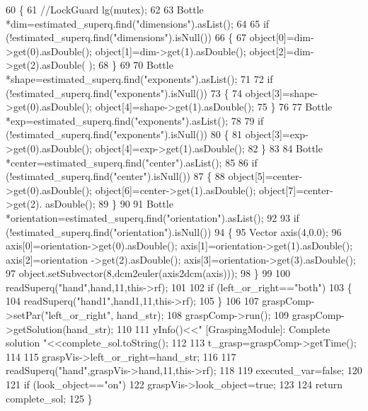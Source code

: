 \begin{DoxyCode}
60 \{
61     \textcolor{comment}{//LockGuard lg(mutex);}
62 
63     Bottle *dim=estimated\_superq.find(\textcolor{stringliteral}{"dimensions"}).asList();
64 
65     \textcolor{keywordflow}{if} (!estimated\_superq.find(\textcolor{stringliteral}{"dimensions"}).isNull())
66     \{
67         \textcolor{keywordtype}{object}[0]=dim->get(0).asDouble(); \textcolor{keywordtype}{object}[1]=dim->get(1).asDouble(); \textcolor{keywordtype}{object}[2]=dim->get(2).asDouble(
      );
68     \}
69 
70     Bottle *shape=estimated\_superq.find(\textcolor{stringliteral}{"exponents"}).asList();
71 
72     \textcolor{keywordflow}{if} (!estimated\_superq.find(\textcolor{stringliteral}{"exponents"}).isNull())
73     \{
74         \textcolor{keywordtype}{object}[3]=shape->get(0).asDouble(); \textcolor{keywordtype}{object}[4]=shape->get(1).asDouble();
75     \}
76 
77     Bottle *exp=estimated\_superq.find(\textcolor{stringliteral}{"exponents"}).asList();
78 
79     \textcolor{keywordflow}{if} (!estimated\_superq.find(\textcolor{stringliteral}{"exponents"}).isNull())
80     \{
81         \textcolor{keywordtype}{object}[3]=exp->get(0).asDouble(); \textcolor{keywordtype}{object}[4]=exp->get(1).asDouble();
82     \}
83 
84     Bottle *center=estimated\_superq.find(\textcolor{stringliteral}{"center"}).asList();
85 
86     \textcolor{keywordflow}{if} (!estimated\_superq.find(\textcolor{stringliteral}{"center"}).isNull())
87     \{
88         \textcolor{keywordtype}{object}[5]=center->get(0).asDouble(); \textcolor{keywordtype}{object}[6]=center->get(1).asDouble(); \textcolor{keywordtype}{object}[7]=center->get(2).
      asDouble();
89     \}
90 
91     Bottle *orientation=estimated\_superq.find(\textcolor{stringliteral}{"orientation"}).asList();
92 
93     \textcolor{keywordflow}{if} (!estimated\_superq.find(\textcolor{stringliteral}{"orientation"}).isNull())
94     \{
95         Vector axis(4,0.0);
96         axis[0]=orientation->get(0).asDouble(); axis[1]=orientation->get(1).asDouble(); axis[2]=orientation
      ->get(2).asDouble(); axis[3]=orientation->get(3).asDouble();
97         \textcolor{keywordtype}{object}.setSubvector(8,dcm2euler(axis2dcm(axis)));
98     \}
99 
100     readSuperq(\textcolor{stringliteral}{"hand"},hand,11,this->rf);
101 
102     \textcolor{keywordflow}{if} (left\_or\_right==\textcolor{stringliteral}{"both"})
103     \{
104         readSuperq(\textcolor{stringliteral}{"hand1"},hand1,11,this->rf);
105     \}
106 
107     graspComp->setPar(\textcolor{stringliteral}{"left\_or\_right"}, hand\_str);
108     graspComp->run();
109     graspComp->getSolution(hand\_str);
110 
111     yInfo()<<\textcolor{stringliteral}{" [GraspingModule]: Complete solution "}<<complete\_sol.toString();
112 
113     t\_grasp=graspComp->getTime();
114 
115     graspVis->left_or_right=hand\_str;
116 
117     readSuperq(\textcolor{stringliteral}{"hand"},graspVis->hand,11,this->rf);
118 
119     executed\_var=\textcolor{keyword}{false};
120 
121     \textcolor{keywordflow}{if} (look\_object==\textcolor{stringliteral}{"on"})
122         graspVis->look_object=\textcolor{keyword}{true};
123 
124     \textcolor{keywordflow}{return} complete\_sol;
125 \}
\end{DoxyCode}

